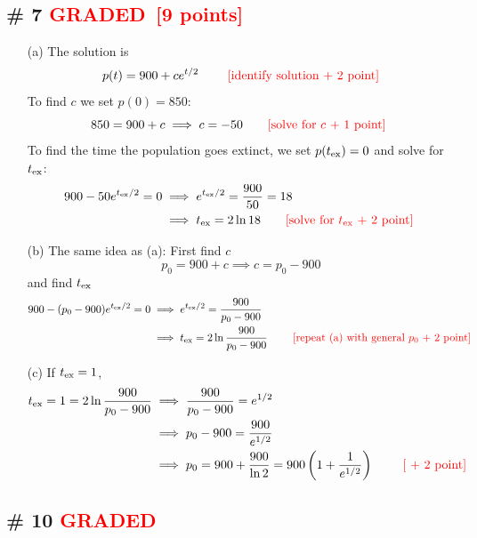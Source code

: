 \documentclass[12pt,letterpaper]{exam}
\newcommand{\grade}{\textcolor{red}{GRADED}}
\newcommand{\pts}[1]{\textcolor{red}{[#1]}}
\begin{document}
\subsection*{\# 7 \grade \, \pts{9 points}}
\begin{enumerate}
\item[(a)] The solution is 
\begin{equation}
p(t) = 900 + ce^{t/2} \quad\quad \text{ \pts{identify solution + 2 point}}
\end{equation}
To find $c$ we set $p(0) = 850$: 
\begin{equation}
850 = 900 + c \implies c = -50 \quad\quad \text{\pts{solve for $c$ + 1 point} }
\end{equation}
To find the time the population goes extinct, we set $p(t_{\rm ex}) = 0$ and solve for $t_{\rm ex}$: 
\begin{align}
900 -50 e^{t_{\rm ex}/2} =0 &\implies e^{t_{\rm ex}/2}  = \frac{900}{50} =18\\
&\implies t_{\rm ex} = 2 \ln18  \quad\quad \text{\pts{solve for $t_{\rm ex}$ + 2 point} }
\end{align}
\item[(b)] The same idea as (a): First find $c$
\begin{equation}
p_0 = 900 + c \implies c = p_0-900
\end{equation}
and find $t_{\rm ex}$
\begin{align}
900 -(p_0-900) e^{t_{\rm ex}/2} =0 &\implies e^{t_{\rm ex}/2}  = \frac{900}{p_0-900}\\
&\implies t_{\rm ex} = 2 \ln\frac{900}{p_0-900} \quad\quad \text{ \pts{repeat (a) with general $p_0$  + 2 point} }
\end{align}
\item[(c)]  If $t_{\rm ex} = 1$, 
\begin{align}
t_{\rm ex}  =1= 2 \ln\frac{900}{p_0-900}&\implies  \frac{900}{p_0-900} =e^{1/2}\\
&\implies p_0-900 = \frac{900}{e^{1/2}} \\
&\implies p_0 =   900 + \frac{900}{\ln 2} = 900\left(1+ \frac{1}{e^{1/2}} \right) \quad \text{ \quad \text{\pts{ + 2 point}}}
\end{align}

\end{enumerate}


\subsection*{\# 10 \grade}
\end{document}
